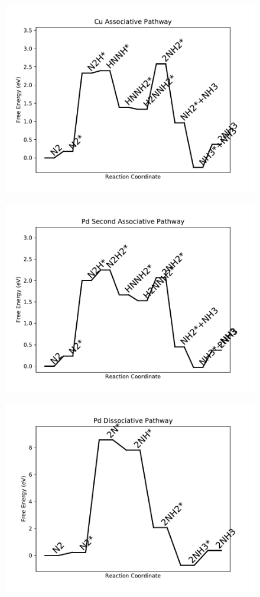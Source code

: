 \begin{figure}
\centering
\includegraphics[width=0.8\linewidth]{data/plots/Cu_associative.pdf}
\end{figure}

\begin{figure}
\centering
\includegraphics[width=0.8\linewidth]{data/plots/Pd_associative_2.pdf}
\end{figure}

\begin{figure}
\centering
\includegraphics[width=0.8\linewidth]{data/plots/Pd_dissociative.pdf}
\end{figure}

